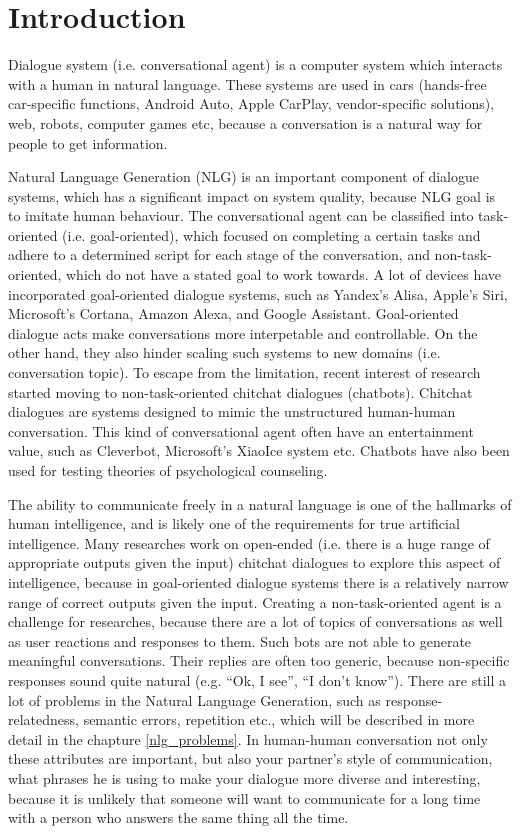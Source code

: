 \chapter{Introduction}\label{introduction}
Dialogue system (i.e. conversational agent) is a computer system which interacts with a human in natural language. These systems are used in cars (hands-free car-specific functions, Android Auto, Apple CarPlay, vendor-specific solutions), web, robots, computer games etc, because a conversation is a natural way for people to get information. 


Natural Language Generation (NLG) is an important component of dialogue systems, which has a significant impact on system quality, because NLG goal is to imitate human behaviour. The conversational agent can be classified into task-oriented (i.e. goal-oriented), which focused on completing a certain tasks and adhere to a determined script for each stage of the conversation, and non-task-oriented, which do not have a stated goal to work towards. A lot of devices have incorporated goal-oriented dialogue systems, such as Yandex’s Alisa, Apple’s Siri, Microsoft’s Cortana, Amazon Alexa, and Google Assistant. Goal-oriented dialogue acts make conversations more interpetable and controllable. On the other hand, they also hinder scaling such systems to new domains (i.e. conversation topic). To escape from the limitation, recent interest of research started moving to non-task-oriented chitchat dialogues (chatbots). Chitchat dialogues are systems designed to mimic the unstructured human-human conversation. This kind of conversational agent often have an entertainment value, such as Cleverbot, Microsoft's XiaoIce system etc. Chatbots have also been used for testing theories of psychological counseling.

The ability to communicate freely in a natural language is one of the hallmarks of human intelligence, and is likely one of the requirements for true artificial intelligence. Many researches work on open-ended (i.e. there is a huge range of appropriate outputs given the input) chitchat dialogues to explore this aspect of intelligence, because in goal-oriented dialogue systems there is a relatively narrow range of correct outputs given the input. 
Creating a non-task-oriented agent is a challenge for researches, because there are a lot of topics of conversations as well as user reactions and responses to them. Such bots are not able to generate meaningful conversations. Their replies are often too generic, because non-specific responses sound quite natural (e.g. ``Ok, I see'', ``I don't know''). There are still a lot of problems in the Natural Language Generation, such as response-relatedness, semantic errors, repetition etc., which will be described in more detail in the chapture \ref{nlg_problems}. In human-human conversation not only these attributes are important, but also your partner's style of communication, what phrases he is using to make your dialogue more diverse and interesting, because it is unlikely that someone will want to communicate for a long time with a person who answers the same thing all the time.

